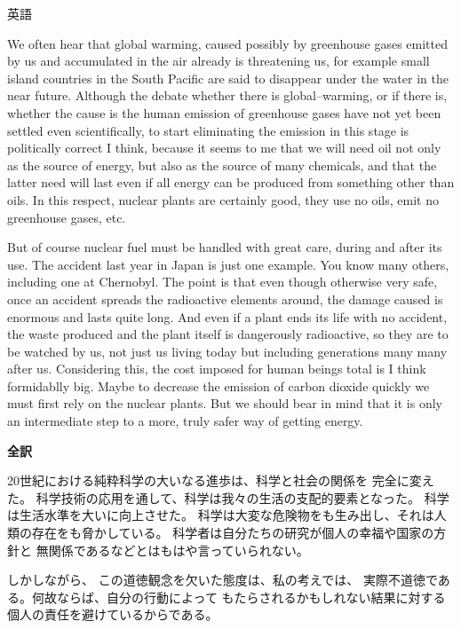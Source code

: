 \documentclass[fleqn]{jbook}
\begin{document}
\begin{answer}{英語}{}
\begin{subanswers}
We often hear that global warming, caused possibly by greenhouse gases
emitted by us and accumulated in the air
already is threatening us,
for example small island countries in the South Pacific
are said to disappear under the water in the near future.
Although the debate whether there is global--warming, or if there is,
whether the cause is the human emission of greenhouse gases have 
not yet been settled even scientifically,
to start eliminating the emission in this stage is politically correct
I think, 
because it seems to me that we will need oil not only as the source of energy,
but also as the source of many chemicals, and that
the latter need will last even if all energy can be produced from
something other than oils.
In this respect, nuclear plants are certainly good,
they use no oils, emit no greenhouse gases, etc.

But of course nuclear fuel must be handled with great care,
during and after its use.
The accident last year in Japan is just one example.
You know many others, including one at Chernobyl.
The point is that even though otherwise very safe,
once an accident spreads the radioactive elements around,
the damage caused is enormous and lasts quite long.
And even if a plant ends its life with no accident,
the waste produced %
and the plant itself is dangerously radioactive,
so they are to be watched by us, not just us living today
but including generations many many after us.
Considering this, 
the cost imposed for human beings total is I think formidablly big.
Maybe to decrease the emission of carbon dioxide quickly
we must first rely on the nuclear plants.
But we should bear in mind that it is only an intermediate step to
a more, truly safer way of getting energy.

\SubAnswer
\textbf{全訳}

20世紀における純粋科学の大いなる進歩は、科学と社会の関係を
完全に変えた。
科学技術の応用を通して、科学は我々の生活の支配的要素となった。
科学は生活水準を大いに向上させた。
科学は大変な危険物をも生み出し、それは人類の存在をも脅かしている。
科学者は自分たちの研究が個人の幸福や国家の方針と
無関係であるなどとはもはや言っていられない。

しかしながら、
この道徳観念を欠いた態度は、私の考えでは、
実際不道徳である。何故ならば、自分の行動によって
もたらされるかもしれない結果に対する
個人の責任を避けているからである。


\end{subanswers}
\end{answer}
\end{document}
